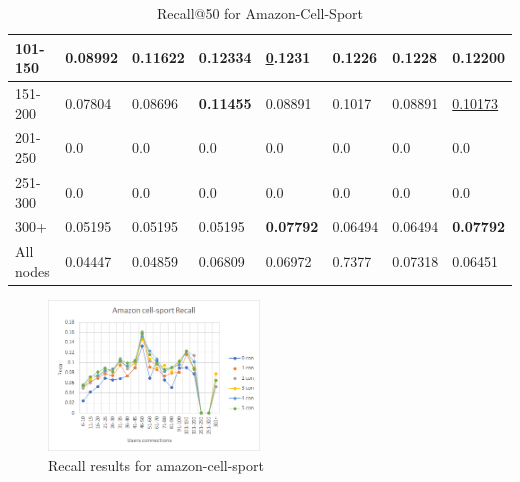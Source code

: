 \begin{table}[h!]
\begin{tabular}{|l|l|l|l|l|l|l||l|}
        101-150     & 0.08992                        & 0.11622                        & \textbf{0.12334}               & {\ul 0.1231}                   & 0.1226                         & 0.1228                          & 0.12200                    \\ \hline
        151-200     & 0.07804                        & 0.08696                        & \textbf{0.11455}               & 0.08891                        & 0.1017                         & 0.08891                          & \underline{0.10173}        \\ \hline
        201-250     & 0.0                            & 0.0                            & 0.0                            & 0.0                            & 0.0                            & 0.0                             & 0.0                        \\ \hline
        251-300     & 0.0                            & 0.0                            & 0.0                            & 0.0                            & 0.0                            & 0.0                             & 0.0                        \\ \hline
        300+        & 0.05195                        & 0.05195                        & 0.05195                        & \textbf{0.07792}               & 0.06494                        & 0.06494                         & \textbf{0.07792}           \\ \hline
        All nodes     & 0.04447                        & 0.04859                        & 0.06809                        & 0.06972                        & 0.7377                         & 0.07318                         & 0.06451                    \\ \hline
    \end{tabular}
    \caption{Recall@50 for Amazon-Cell-Sport}
    \label{tab:Amazon-Cell-Sport-recall-evaluation}
\end{table}

\begin{figure}[h!]
    \includegraphics[width=0.5\textwidth]{figures/evaluation/amazon-cell-sport-recall.png}
    \centering
    \caption{Recall results for amazon-cell-sport}
    \label{fig:Amazon-Cell-Sport-recall-evaluation}
\end{figure}
\clearpage

